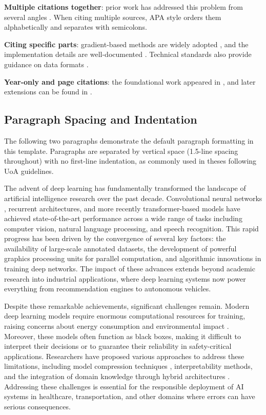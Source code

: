 \textbf{Multiple citations together}: prior work has
addressed this problem from several angles \parencite{example2024,
chen2023survey,liu2024cnn}.  When citing multiple sources, APA style
orders them alphabetically and separates with semicolons.

\textbf{Citing specific parts}: gradient-based methods are widely
adopted \parencite[see][chap.\ 3]{patel2024optimisation}, and the
implementation details are well-documented
\parencite{moore2024documentation}.  Technical standards also provide
guidance on data formats \parencite{ietf2024}.

\textbf{Year-only and page citations}: the foundational work appeared
in \citeyear{examplebook2023}, and later extensions can be found in
\textcite[p.~45]{wang2024thesis}.

\subsection{Paragraph Spacing and Indentation}

The following two paragraphs demonstrate the default paragraph
formatting in this template.  Paragraphs are separated by vertical
space (1.5-line spacing throughout) with no first-line indentation,
as commonly used in theses following UoA guidelines.

The advent of deep learning has fundamentally transformed the
landscape of artificial intelligence research over the past decade.
Convolutional neural networks \parencite{liu2024cnn}, recurrent
architectures, and more recently transformer-based models have
achieved state-of-the-art performance across a wide range of tasks
including computer vision, natural language processing, and speech
recognition.  This rapid progress has been driven by the convergence
of several key factors: the availability of large-scale annotated
datasets, the development of powerful graphics processing units for
parallel computation, and algorithmic innovations in training deep
networks.  The impact of these advances extends beyond academic
research into industrial applications, where deep learning systems
now power everything from recommendation engines to autonomous
vehicles.

Despite these remarkable achievements, significant challenges remain.
Modern deep learning models require enormous computational resources
for training, raising concerns about energy consumption and
environmental impact \parencite{chen2023survey}.  Moreover, these
models often function as black boxes, making it difficult to
interpret their decisions or to guarantee their reliability in
safety-critical applications.  Researchers have proposed various
approaches to address these limitations, including model compression
techniques \parencite{wang2024thesis}, interpretability methods, and
the integration of domain knowledge through hybrid architectures
\parencite{patel2024optimisation}.  Addressing these challenges is
essential for the responsible deployment of AI systems in healthcare,
transportation, and other domains where errors can have serious
consequences.

